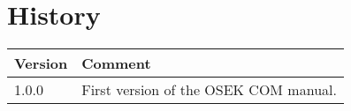 \chapter{History}

\begin{tabular}{|p{}|p{}|}
\hline 
Version &
Comment
\tabularnewline
\hline
\hline 
1.0.0 &
First version of the OSEK COM manual.
\tabularnewline
\hline 
\end{tabular}
